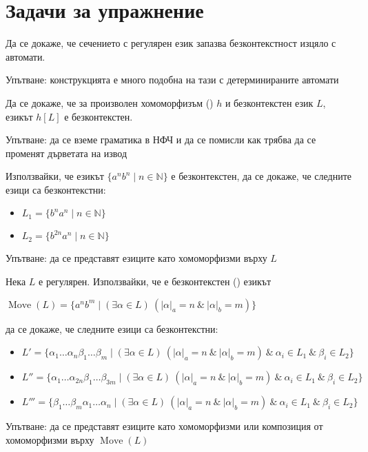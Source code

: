 \section{Задачи за упражнение}

\begin{problem}
Да се докаже, че сечението с регулярен език запазва безконтекстност изцяло с автомати.

Упътване: конструкцията е много подобна на тази с детерминираните автомати
\end{problem}

\begin{problem}
Да се докаже, че за произволен хомоморфизъм () $h$ и безконтекстен език $L$, езикът $h[L]$ е безконтекстен.

Упътване: да се вземе граматика в НФЧ и да се помисли как трябва да се променят дърветата на извод
\end{problem}

\begin{problem}
Използвайки, че езикът $\{ a^nb^n \mid n \in \mathbb{N} \}$ е безконтекстен, да се докаже, че следните езици са безконтекстни:

\begin{itemize}
    \item $L_1 = \{ b^na^n \mid n \in \mathbb{N} \}$
    \item $L_2 = \{ b^{2n}a^n \mid n \in \mathbb{N} \}$
\end{itemize}

Упътване: да се представят езиците като хомоморфизми върху $L$
\end{problem}

\begin{problem}
Нека $L$ е регулярен.
Използвайки, че е безконтекстен () езикът

\begin{center}
    $\operatorname{Move}(L) = \{ a^n b^m \mid (\exists \alpha \in L) \: (|\alpha|_a = n \: \& \: |\alpha|_b = m) \}$
\end{center}

да се докаже, че следните езици са безконтекстни:

\begin{itemize}
    \item $L' = \{ \alpha_1 \dots \alpha_n \beta_1 \dots \beta_m \mid (\exists \alpha \in L) \: (|\alpha|_a = n \: \& \: |\alpha|_b = m) \: \& \: \alpha_i \in L_1 \: \& \: \beta_i \in L_2 \}$
    \item $L'' = \{ \alpha_1 \dots \alpha_{2n} \beta_1 \dots \beta_{3m} \mid (\exists \alpha \in L) \: (|\alpha|_a = n \: \& \: |\alpha|_b = m) \: \& \: \alpha_i \in L_1 \: \& \: \beta_i \in L_2 \}$
    \item $L''' = \{ \beta_1 \dots \beta_m \alpha_1 \dots \alpha_n \mid (\exists \alpha \in L) \: (|\alpha|_a = n \: \& \: |\alpha|_b = m) \: \& \: \alpha_i \in L_1 \: \& \: \beta_i \in L_2 \}$
\end{itemize}

Упътване: да се представят езиците като хомоморфизми или композиция от хомоморфизми върху $\operatorname{Move}(L)$
\end{problem}


